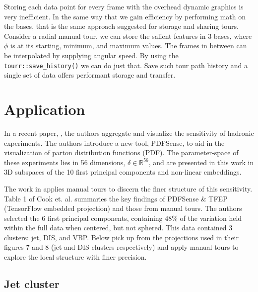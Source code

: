 \documentclass{monashthesis}
\begin{document}
Storing each data point for every frame with the overhead dynamic
graphics is very inefficient. In the same way that we gain efficiency by
performing math on the bases, that is the same approach suggested for
storage and sharing tours. Consider a radial manual tour, we can store
the salient features in 3 bases, where \(\phi\) is at its starting,
minimum, and maximum values. The frames in between can be interpolated
by supplying angular speed. By using the \texttt{tourr::save\_history()}
we can do just that. Save such tour path history and a single set of
data offers performant storage and transfer.

\section{Application}\label{sec:application}

In a recent paper, \textcite{wang_visualizing_2018}, the authors
aggregate and visualize the sensitivity of hadronic experiments. The
authors introduce a new tool, PDFSense, to aid in the visualization of
parton distribution functions (PDF). The parameter-space of these
experiments lies in 56 dimensions, \(\delta \in \mathbb{R}^{56}\), and
are presented in this work in 3D subspaces of the 10 first principal
components and non-linear embeddings.

The work in \textcite{cook_dynamical_2018} applies manual tours to
discern the finer structure of this sensitivity. Table 1 of Cook et. al.
summaries the key findings of PDFSense \& TFEP (TensorFlow embedded
projection) and those from manual tours. The authors selected the 6
first principal components, containing 48\% of the variation held within
the full data when centered, but not sphered. This data contained 3
clusters: jet, DIS, and VBP. Below pick up from the projections used in
their figures 7 and 8 (jet and DIS clusters respectively) and apply
manual tours to explore the local structure with finer precision.

\subsection{Jet cluster}\label{jet-cluster}
\end{document}
